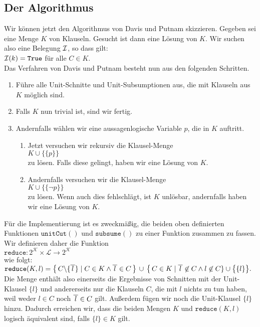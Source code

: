 \subsection{Der Algorithmus}
Wir können jetzt den Algorithmus von Davis und Putnam skizzieren.
Gegeben sei eine Menge $K$ von Klauseln.  Gesucht ist dann eine Lösung von $K$.  Wir
suchen  also eine Belegung $\mathcal{I}$, so dass gilt: \\[0.2cm]
\hspace*{1.3cm} $\mathcal{I}(k) = \texttt{True}$ \quad für alle $C \in K$.\\[0.2cm]
Das Verfahren von Davis und Putnam besteht nun aus den folgenden Schritten.
\begin{enumerate}
\item Führe alle Unit-Schnitte und Unit-Subsumptionen aus, die mit Klauseln aus $K$ möglich sind.
\item Falls $K$ nun trivial ist, sind wir fertig.
\item Andernfalls wählen wir eine aussagenlogische Variable $p$, die in $K$ auftritt.
      \begin{enumerate}
      \item Jetzt versuchen  wir rekursiv  die Klausel-Menge \\[0.2cm]
            \hspace*{1.3cm}  $K \cup \bigl\{\{p\}\bigr\}$ \\[0.2cm]
            zu lösen. Falls diese gelingt, haben wir eine Lösung von $K$.
      \item Andernfalls versuchen wir  die Klausel-Menge \\[0.2cm]
            \hspace*{1.3cm} $K \cup \bigl\{\{\neg p\}\bigr\}$ \\[0.2cm]
            zu lösen.  Wenn auch dies fehlschlägt, ist $K$ unlösbar, andernfalls
            haben wir eine Lösung von $K$.
      \end{enumerate}
\end{enumerate}
Für die Implementierung ist es zweckmäßig, die beiden oben definierten Funktionen $\texttt{unitCut}()$ und
$\texttt{subsume}()$ zu einer Funktion zusammen zu fassen.  Wir definieren daher die Funktion
\\[0.2cm]
\hspace*{1.3cm}
$\texttt{reduce}: 2^\mathcal{K} \times \mathcal{L} \rightarrow 2^\mathcal{K}$
\\[0.2cm]
wie folgt: 
\\[0.2cm]
\hspace*{1.3cm}
$\texttt{reduce}(K,l)  = 
 \bigl\{\, C \backslash \{\overline{\,l\,}\} \;|\; C \in K \wedge \overline{\,l\,} \in C \,\bigr\} 
       \,\cup\, \bigl\{\, C \in K \mid \overline{\,l\,} \not\in C \wedge l \not\in C \} \cup \bigl\{\{l\}\bigr\}.
$
\\[0.2cm]
Die Menge enthält also einerseits die Ergebnisse von Schnitten mit
der Unit-Klausel $\{l\}$ und andererseits nur die Klauseln $C$,
die mit $l$ nichts zu tun haben, weil weder $l \in C$ noch $\overline{\,l\,} \in C$
gilt.  Außerdem fügen wir noch die Unit-Klausel $\{l\}$ hinzu.
Dadurch erreichen wir, dass die beiden Mengen $K$ und $\texttt{reduce}(K,l)$
logisch äquivalent sind, falls $\{l\} \in K$ gilt.


